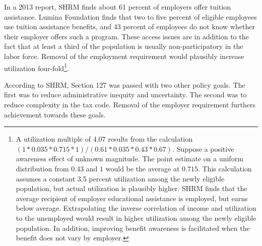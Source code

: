 \documentclass[review]{elsarticle}
\begin{document}
In a 2013 report, SHRM finds about 61 percent of employers offer tuition assistance\cite{cherry2014rejuvenating}.
Lumina Foundation finds that two to five percent of eligible employees use tuition assistance benefits,
and 43 percent of employees do not know whether their employer offers such a program\cite{glover_2017}.
These access issues are in addition to the fact that at least a third of the population is usually non-participatory in the labor force.
Removal of the employment requirement would plausibly increase utilization four-fold\footnote{
    A utilization multiple of 4.07 results from the calculation $(1*0.035*0.715*1) / (0.61*0.035*0.43*0.67)$.
    Suppose a positive awareness effect of unknown magnitude.
    The point estimate on a uniform distribution from $0.43$ and $1$ would be the average at $0.715$.
    This calculation assumes a constant 3.5 percent utilization among the newly eligible population,
    but actual utilization is plausibly higher.
    SHRM finds that the average recipient of employer educational assistance is employed, but earns below average.
    Extrapolating the inverse correlation of income and utilization to the unemployed would result in
    higher utilization among the newly eligible population.
    In addition, improving benefit awareness is facilitated when the benefit does not vary by employer.
}.

According to SHRM, Section 127 was passed with two other policy goals.
The first was to reduce administrative inequity and uncertainty.
The second was to reduce complexity in the tax code.
Removal of the employer requirement furthers achievement towards these goals.
\end{document}
